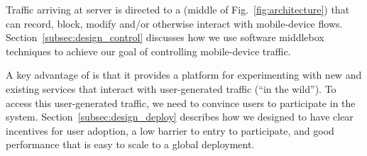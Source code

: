 Traffic arriving at \meddle server is directed to a \meddlebox (middle of Fig.~\ref{fig:architecture}) 
that can record, block, modify and/or otherwise interact 
with mobile-device flows. Section~\ref{subsec:design_control} discusses how we 
use software middlebox techniques to achieve our goal of controlling mobile-device traffic. 

A key advantage of \meddle is that it provides a platform for experimenting 
with new and existing services that interact with user-generated traffic (\ie ``in the wild''). 
To access this user-generated traffic, we need to convince users to participate in the system. 
Section~\ref{subsec:design_deploy} describes how we designed \meddle to have clear 
incentives for user adoption, a low barrier to entry to participate, and good performance that 
is easy to scale to a global deployment.





